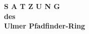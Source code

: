 \begin{titlepage}
    \begin{center}
        \begin{Huge}
            \textbf{
                S A T Z U N G\\
                \vspace{20pt}
                des\\ 
                \vspace{20pt}
                Ulmer Pfadfinder-Ring\\
            }
        \end{Huge}
    \end{center}
\end{titlepage}
